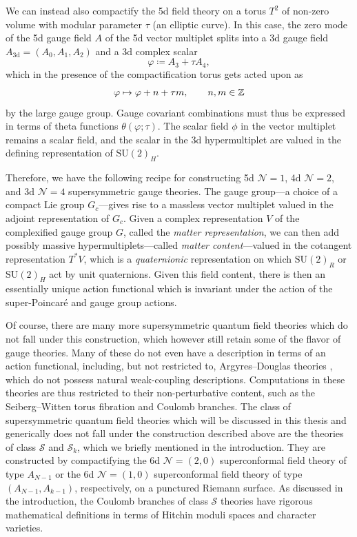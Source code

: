 We can instead also compactify the 5d field theory on a torus $T^2$ of non-zero volume with modular parameter $\tau$ (an elliptic curve). In this case, the zero mode of the 5d gauge field $A$ of the 5d vector multiplet splits into a 3d gauge field $A_\text{3d} = (A_0,A_1,A_2)$ and a 3d complex scalar
\begin{equation}
	\varphi \coloneq A_3 + \tau A_4,
\end{equation}
which in the presence of the compactification torus gets acted upon as
\begin{equation}
	\varphi \mapsto \varphi + n + \tau m, \qquad n,m \in \mathbb{Z}
\end{equation}
by the large gauge group. Gauge covariant combinations must thus be expressed in terms of theta functions $\theta(\varphi;\tau)$. The scalar field $\phi$ in the vector multiplet remains a scalar field, and the scalar in the 3d hypermultiplet are valued in the defining representation of $\mathrm{SU}(2)_H$.

Therefore, we have the following recipe for constructing 5d $\mathcal{N}=1$, 4d $\mathcal{N}=2$, and 3d $\mathcal{N}=4$ supersymmetric gauge theories. The gauge group---a choice of a compact Lie group $G_c$---gives rise to a massless vector multiplet valued in the adjoint representation of $G_c$. Given a complex representation $V$ of the complexified gauge group $G$, called the \emph{matter representation}, we can then add possibly massive hypermultiplets---called \emph{matter content}---valued in the cotangent representation $T^* V$, which is a \emph{quaternionic} representation on which $\mathrm{SU}(2)_R$ or $\mathrm{SU}(2)_H$ act by unit quaternions. Given this field content, there is then an essentially unique action functional which is invariant under the action of the super-Poincaré and gauge group actions.

Of course, there are many more supersymmetric quantum field theories which do not fall under this construction, which however still retain some of the flavor of gauge theories. Many of these do not even have a description in terms of an action functional, including, but not restricted to, Argyres--Douglas theories \cite{argyres_new_1995}, which do not possess natural weak-coupling descriptions. Computations in these theories are thus restricted to their non-perturbative content, such as the Seiberg--Witten torus fibration and Coulomb branches. The class of supersymmetric quantum field theories which will be discussed in this thesis and generically does not fall under the construction described above are the theories of class $\mathcal{S}$ and $\mathcal{S}_k$, which we briefly mentioned in the introduction. They are constructed by compactifying the 6d $\mathcal{N}=(2,0)$ superconformal field theory of type $A_{N-1}$ or the 6d $\mathcal{N}=(1,0)$ superconformal field theory of type $(A_{N-1},A_{k-1})$, respectively, on a punctured Riemann surface. As discussed in the introduction, the Coulomb branches of class $\mathcal{S}$ theories have rigorous mathematical definitions in terms of Hitchin moduli spaces and character varieties.

